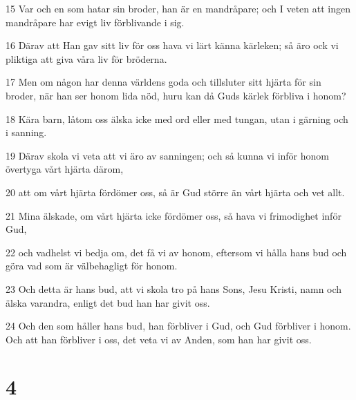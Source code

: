 \par 15 Var och en som hatar sin broder, han är en mandråpare; och I veten att ingen mandråpare har evigt liv förblivande i sig.
\par 16 Därav att Han gav sitt liv för oss hava vi lärt känna kärleken; så äro ock vi pliktiga att giva våra liv för bröderna.
\par 17 Men om någon har denna världens goda och tillsluter sitt hjärta för sin broder, när han ser honom lida nöd, huru kan då Guds kärlek förbliva i honom?
\par 18 Kära barn, låtom oss älska icke med ord eller med tungan, utan i gärning och i sanning.
\par 19 Därav skola vi veta att vi äro av sanningen; och så kunna vi inför honom övertyga vårt hjärta därom,
\par 20 att om vårt hjärta fördömer oss, så är Gud större än vårt hjärta och vet allt.
\par 21 Mina älskade, om vårt hjärta icke fördömer oss, så hava vi frimodighet inför Gud,
\par 22 och vadhelst vi bedja om, det få vi av honom, eftersom vi hålla hans bud och göra vad som är välbehagligt för honom.
\par 23 Och detta är hans bud, att vi skola tro på hans Sons, Jesu Kristi, namn och älska varandra, enligt det bud han har givit oss.
\par 24 Och den som håller hans bud, han förbliver i Gud, och Gud förbliver i honom. Och att han förbliver i oss, det veta vi av Anden, som han har givit oss.

\chapter{4}

